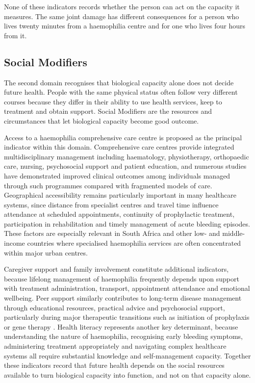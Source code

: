 None of these indicators records whether the person can act on the capacity
it measures. The same joint damage has different consequences for a person who
lives twenty minutes from a haemophilia centre and for one who lives four
hours from it.

\subsection{Social Modifiers}

The second domain recognises that biological capacity alone does not decide future health. People with the same physical status often follow very different courses because they differ in their ability to use health services, keep to treatment and obtain support. Social Modifiers are the resources and circumstances that let biological capacity become good outcome.

Access to a haemophilia comprehensive care centre is proposed as the principal indicator within this domain. Comprehensive care centres provide integrated multidisciplinary management including haematology, physiotherapy, orthopaedic care, nursing, psychosocial support and patient education, and numerous studies have demonstrated improved clinical outcomes among individuals managed through such programmes compared with fragmented models of care. Geographical accessibility remains particularly important in many healthcare systems, since distance from specialist centres and travel time influence attendance at scheduled appointments, continuity of prophylactic treatment, participation in rehabilitation and timely management of acute bleeding episodes. These factors are especially relevant in South Africa and other low- and middle-income countries where specialised haemophilia services are often concentrated within major urban centres.

Caregiver support and family involvement constitute additional indicators, because lifelong management of haemophilia frequently depends upon support with treatment administration, transport, appointment attendance and emotional wellbeing. Peer support similarly contributes to long-term disease management through educational resources, practical advice and psychosocial support, particularly during major therapeutic transitions such as initiation of prophylaxis or gene therapy \citep{srivastava_2020}. Health literacy represents another key determinant, because understanding the nature of haemophilia, recognising early bleeding symptoms, administering treatment appropriately and navigating complex healthcare systems all require substantial knowledge and self-management capacity. Together these indicators record that future health depends on the social resources available to turn biological capacity into function, and not on that capacity alone.

